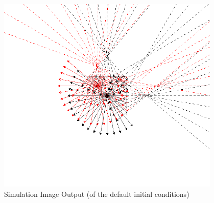 \documentclass{article}
\begin{document}
\begin{figure}[htbp]
  \begin{center}
    \includegraphics[width=0.95\textwidth]{figures/20231106-112653.png}
  \end{center}
  \caption{Simulation Image Output (of the default initial conditions)}
\end{figure}
\end{document}
